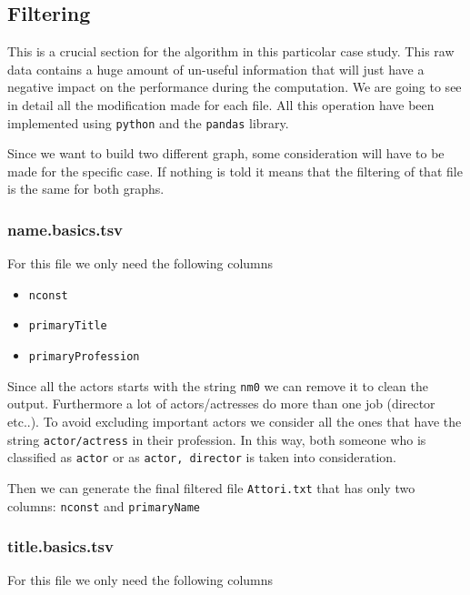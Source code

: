 \newpage
\subsection{Filtering} \label{filtering}

This is a crucial section for the algorithm in this particolar case study. This raw data contains a huge amount of un-useful information that will just have a negative impact on the performance during the computation. We are going to see in detail all the modification made for each file. All this operation have been implemented using \texttt{python} and the \texttt{pandas} library. \s

\nd Since we want to build two different graph, some consideration will have to be made for the specific case. If nothing is told it means that the filtering of that file is the same for both graphs.

\subsubsection{name.basics.tsv}

For this file we only need the following columns

\begin{itemize}
    \item \texttt{nconst}
    \item \texttt{primaryTitle}
    \item \texttt{primaryProfession}
\end{itemize}
Since all the actors starts with the string \texttt{nm0} we can remove it to clean the output. Furthermore a lot of actors/actresses do more than one job (director etc..). To avoid excluding important actors we consider all the ones that have the string \texttt{actor/actress} in their profession. In this way, both someone who is classified as \texttt{actor} or as \texttt{actor, director} is taken into consideration. \s

\noindent Then we can generate the final filtered file \texttt{Attori.txt} that has only two columns: \texttt{nconst} and \texttt{primaryName}


\subsubsection{title.basics.tsv}

For this file we only need the following columns

